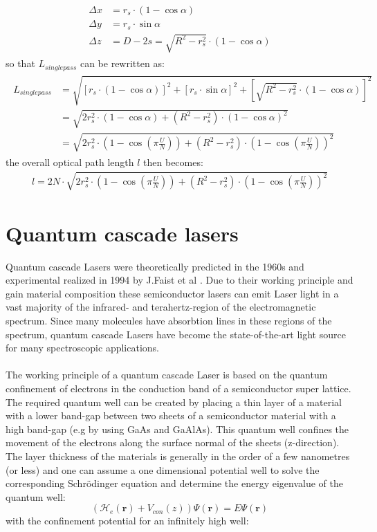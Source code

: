 \begin{align}
	\begin{split}
		\Delta x &=  r_s \cdot (1-\cos{\alpha})\\
		\Delta y &=  r_s \cdot \sin{\alpha}\\
		\Delta z &= D-2s = \sqrt{R^2-r_s^2}\cdot (1-\cos{\alpha})
	\end{split}
\end{align}
so that $L_{singlepass}$ can be rewritten as:
\begin{align}
\begin{split}
	L_{single pass} &= \sqrt{[r_s \cdot (1-\cos{\alpha})]^2+[r_s \cdot \sin{\alpha}]^2+[\sqrt{R^2-r_s^2}\cdot (1-\cos{\alpha})]^2}\\
	&= \sqrt{2r_s^2\cdot(1-\cos{\alpha})+(R^2-r_s^2)\cdot(1-\cos{\alpha})^2} \\
	&= \sqrt{2r_s^2\cdot(1-\cos{(\pi\frac{U}{N})})+(R^2-r_s^2)\cdot(1-\cos{(\pi\frac{U}{N})})^2}
\end{split}	
\end{align}
the overall optical path length $l$ then becomes:
\begin{align}
	l= 2N\cdot \sqrt{2r_s^2\cdot(1-\cos{(\pi\frac{U}{N})})+(R^2-r_s^2)\cdot(1-\cos{(\pi\frac{U}{N})})^2}
\end{align}

\section{Quantum cascade lasers}
Quantum cascade Lasers were theoretically predicted in the 1960s and experimental realized in 1994 by J.Faist et al \parencite{Faist1994}. Due to their working principle and gain material composition these semiconductor lasers can emit Laser light in a vast majority of the infrared- and terahertz-region of the electromagnetic spectrum. Since many molecules have absorbtion lines in these regions of the spectrum, quantum cascade Lasers have become the state-of-the-art light source for many spectroscopic applications.\\ \\ 
The working principle of a quantum cascade Laser is based on the quantum confinement of electrons in the conduction band of a semiconductor super lattice.
The required quantum well can be created by placing a thin layer of a material with a lower band-gap between two sheets of a semiconductor material with a high band-gap (e.g by using GaAs and GaAlAs). This quantum well confines the movement of the electrons along the surface normal of the sheets (z-direction). The layer thickness of the materials is generally in the order of a few nanometres (or less) and one can assume a one dimensional potential well to solve the corresponding Schrödinger equation and determine the energy eigenvalue of the quantum well:
\begin{equation}
(\mathcal{H}_{e}(\textbf{r}) + V_{con}(z))\Psi(\textbf{r}) = E\Psi(\textbf{r})
\label{Schroedinger-equation-quantum-well}
\end{equation}
with the confinement potential for an infinitely high well:

